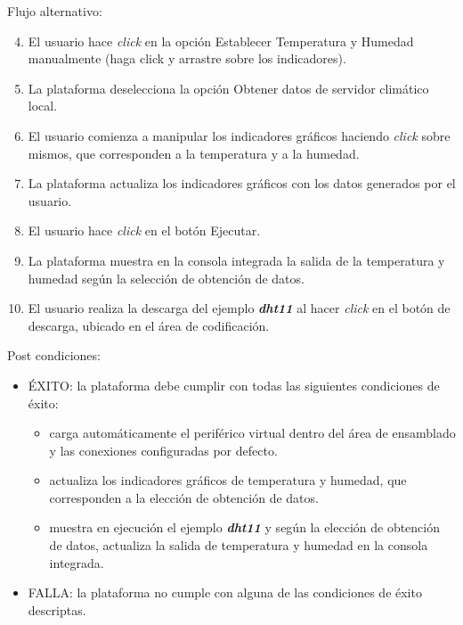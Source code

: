 Flujo alternativo:
\begin{enumerate}
    \setcounter{enumi}{3}
	\item El usuario hace \textit{click} en la opción \textquotedbl Establecer Temperatura y Humedad manualmente (haga click y arrastre sobre los indicadores).\textquotedbl
	\item La plataforma deselecciona la opción \textquotedbl Obtener datos de servidor climático local.\textquotedbl
    \item El usuario comienza a manipular los indicadores gráficos haciendo \textit{click} sobre mismos, que corresponden a la temperatura y a la humedad.
    \item La plataforma actualiza los indicadores gráficos con los datos generados por el usuario.

	\item El usuario hace \textit{click} en el botón \textquotedbl Ejecutar\textquotedbl.
	
	\item La plataforma muestra en la consola integrada la salida de la temperatura y humedad según la selección de obtención de datos.
	
	\item El usuario realiza la descarga del ejemplo \textit{\textbf{dht11}} al hacer \textit{click} en el botón de descarga, ubicado en el área de codificación.
\end{enumerate}

Post condiciones:
\begin{itemize}
	\item ÉXITO: la plataforma debe cumplir con todas las siguientes condiciones de éxito:
	
		\begin{itemize}
	    \item  carga automáticamente el periférico virtual dentro del área de ensamblado y las conexiones configuradas por defecto.
	    
	    \item actualiza los indicadores gráficos de temperatura y humedad, que  corresponden a la elección de obtención de datos.

	    \item muestra en ejecución el ejemplo \textit{\textbf{dht11}} y según la elección de obtención de datos, actualiza la salida de temperatura y humedad en la consola integrada.
	    \end{itemize}
	
	\item FALLA: la plataforma no cumple con alguna de las condiciones de éxito descriptas.
\end{itemize}

